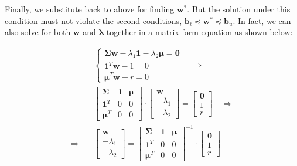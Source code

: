 \documentclass{beamer}
\begin{document}
\begin{frame}

\justifying
Finally, we substitute back to above for finding $\mathbf{w}^{*}$. But the solution under this condition must not violate the second conditions, $\mathbf{b}_{\ell} \preccurlyeq \mathbf{w}^{*} \preccurlyeq \mathbf{b}_{u}$. In fact, we can also solve for both $\mathbf{w}$ and $\boldsymbol\lambda$ together in a matrix form equation as shown below:

\justifying
\begin{equation*}
\begin{aligned}
	& \begin{cases}
	\mathbf{\Sigma}\mathbf{w} - \lambda_{1} \mathbf{1} - \lambda_{2} \boldsymbol\mu = \mathbf{0} \\
	\mathbf{1}^{T}\mathbf{w} - 1 = 0 \\
	\boldsymbol\mu^{T}\mathbf{w} - r = 0
	\end{cases}
	\quad \Rightarrow \\
	& \begin{bmatrix}
		\mathbf{\Sigma} & \mathbf{1} & \boldsymbol\mu \\
		\mathbf{1}^{T} & 0 & 0 \\
		\boldsymbol\mu^{T} & 0 & 0
	   \end{bmatrix}
	   \cdot
	   \begin{bmatrix}
	   	\mathbf{w} \\
		-\lambda_{1} \\
		-\lambda_{2}
	  \end{bmatrix}
	  =
	  \begin{bmatrix}
	  	\mathbf{0} \\ 
		1 \\
		r
	\end{bmatrix}
	\quad \Rightarrow \\
	\Rightarrow \quad &
	\begin{bmatrix}
	   	\mathbf{w} \\
		-\lambda_{1} \\
		-\lambda_{2}
	  \end{bmatrix}
	  =
	   \begin{bmatrix}
		\mathbf{\Sigma} & \mathbf{1} & \boldsymbol\mu \\
		\mathbf{1}^{T} & 0 & 0 \\
		\boldsymbol\mu^{T} & 0 & 0
	   \end{bmatrix}^{-1}
	  \cdot
	  \begin{bmatrix}
	  	\mathbf{0} \\ 
		1 \\
		r
	\end{bmatrix}
\end{aligned}
\end{equation*}

\end{frame}
\end{document}
